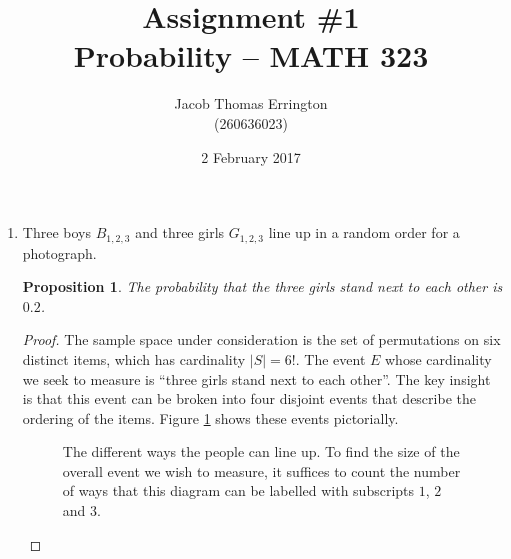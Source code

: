\documentclass[letterpaper,11pt]{article}
\author{Jacob Thomas Errington\\(260636023)}
\date{2 February 2017}
\title{Assignment \#1 \\ Probability -- MATH 323}
\newtheorem{proposition}{Proposition}
\begin{document}
\maketitle

\begin{enumerate}
    \item
        Three boys $B_{1,2,3}$ and three girls $G_{1,2,3}$ line up in a random
        order for a photograph.

        \begin{proposition}
            The probability that the three girls stand next to each other is
            $0.2$.
        \end{proposition}

        \begin{proof}
            The sample space under consideration is the set of permutations on
            six distinct items, which has cardinality $|S| = 6!$. The event $E$
            whose cardinality we seek to measure is ``three girls
            stand next to each other''. The key insight is that this event can
            be broken into four disjoint events that describe the ordering of
            the items. Figure \ref{fig:lineups} shows these events pictorially.

            \begin{figure}[ht]
                \centering
                \newcommand{\lineup}[6]{
                    \node (#1) {$#1$} ;
                    \&
                    \node (#2) {$#2$} ;
                    \&
                    \node (#3) {$#3$} ;
                    \&
                    \node (#4) {$#4$} ;
                    \&
                    \node (#5) {$#5$} ;
                    \&
                    \node (#6) {$#6$} ;
                    \\
                }
                \caption{
                    The different ways the people can line up. To find the size of
                    the overall event we wish to measure, it suffices to count the
                    number of ways that this diagram can be labelled with
                    subscripts $1$, $2$ and $3$.
                }
                \label{fig:lineups}
            \end{figure}


\end{proof}
\end{enumerate}
\end{document}
